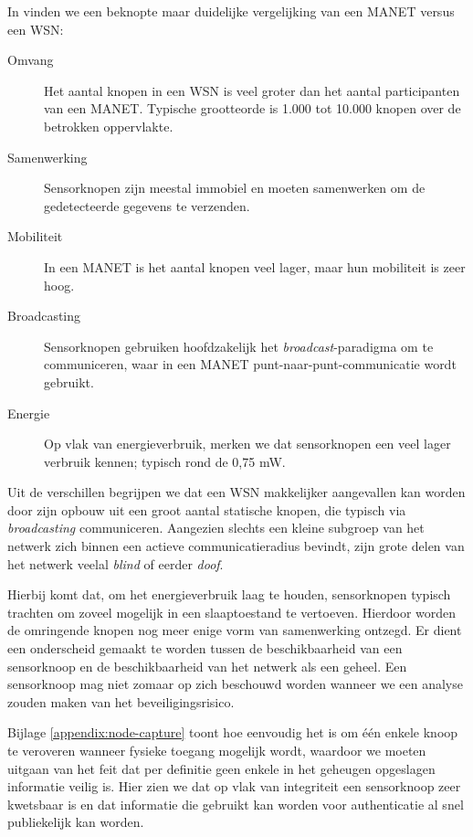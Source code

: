 In \citep{garg2010mobile} vinden we een beknopte maar duidelijke vergelijking
van een MANET versus een WSN:

\begin{description}

  \item[Omvang] Het aantal knopen in een WSN is veel groter dan het aantal
  participanten van een MANET. Typische grootteorde is 1.000 tot 10.000 knopen
  over de betrokken oppervlakte.

  \item[Samenwerking] Sensorknopen zijn meestal immobiel en moeten samenwerken
  om de gedetecteerde gegevens te verzenden.

  \item[Mobiliteit] In een MANET is het aantal knopen veel lager, maar hun
  mobiliteit is zeer hoog.

  \item[Broadcasting] Sensorknopen gebruiken hoofdzakelijk het
  \emph{broadcast}-paradigma om te communiceren, waar in een MANET
  punt-naar-punt-communicatie wordt gebruikt.

  \item[Energie] Op vlak van energieverbruik, merken we dat sensorknopen een
  veel lager verbruik kennen; typisch rond de 0,75 mW.

\end{description}

Uit de verschillen begrijpen we dat een WSN makkelijker aangevallen kan worden
door zijn opbouw uit een groot aantal statische knopen, die typisch via
\emph{broadcasting} communiceren. Aangezien slechts een kleine subgroep van het
netwerk zich binnen een actieve communicatieradius bevindt, zijn grote delen
van het netwerk veelal \emph{blind} of eerder \emph{doof}.

Hierbij komt dat, om het energieverbruik laag te houden, sensorknopen typisch
trachten om zoveel mogelijk in een slaaptoestand te vertoeven. Hierdoor worden
de omringende knopen nog meer enige vorm van samenwerking ontzegd. Er dient een
onderscheid gemaakt te worden tussen de beschikbaarheid van een sensorknoop en
de beschikbaarheid van het netwerk als een geheel. Een sensorknoop mag niet
zomaar op zich beschouwd worden wanneer we een analyse zouden maken van het
beveiligingsrisico.

Bijlage \ref{appendix:node-capture} toont hoe eenvoudig het is om \'e\'en
enkele knoop te veroveren wanneer fysieke toegang mogelijk wordt, waardoor we
moeten uitgaan van het feit dat per definitie geen enkele in het geheugen
opgeslagen informatie veilig is. Hier zien we dat op vlak van integriteit een
sensorknoop zeer kwetsbaar is en dat informatie die gebruikt kan worden voor
authenticatie al snel publiekelijk kan worden.

